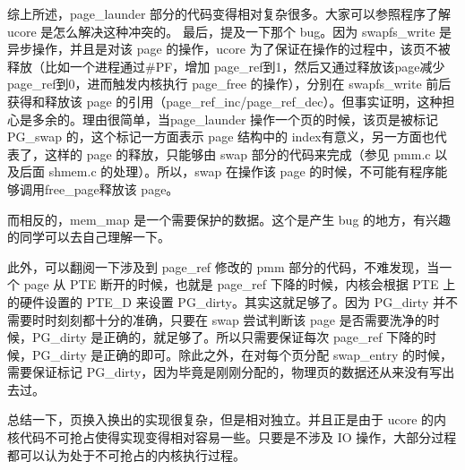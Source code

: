 综上所述，page\_launder
部分的代码变得相对复杂很多。大家可以参照程序了解ucore
是怎么解决这种冲突的。 最后，提及一下那个 bug。因为 swapfs\_write
是异步操作，并且是对该 page 的操作，ucore
为了保证在操作的过程中，该页不被释放（比如一个进程通过\#PF，增加
page\_ref到1，然后又通过释放该page减少page\_ref到0，进而触发内核执行
page\_free 的操作），分别在 swapfs\_write 前后获得和释放该 page
的引用（page\_ref\_inc/page\_ref\_dec）。但事实证明，这种担心是多余的。理由很简单，当page\_launder
操作一个页的时候，该页是被标记 PG\_swap 的，这个标记一方面表示 page
结构中的 index有意义，另一方面也代表了，这样的 page 的释放，只能够由
swap 部分的代码来完成（参见 pmm.c 以及后面 shmem.c 的处理）。所以，swap
在操作该 page 的时候，不可能有程序能够调用free\_page释放该 page。

而相反的，mem\_map 是一个需要保护的数据。这个是产生 bug
的地方，有兴趣的同学可以去自己理解一下。

此外，可以翻阅一下涉及到 page\_ref 修改的 pmm
部分的代码，不难发现，当一个 page 从 PTE 断开的时候，也就是 page\_ref
下降的时候，内核会根据 PTE 上的硬件设置的 PTE\_D 来设置
PG\_dirty。其实这就足够了。因为 PG\_dirty
并不需要时时刻刻都十分的准确，只要在 swap 尝试判断该 page
是否需要洗净的时候，PG\_dirty 是正确的，就足够了。所以只需要保证每次
page\_ref 下降的时候，PG\_dirty 是正确的即可。除此之外，在对每个页分配
swap\_entry 的时候，需要保证标记
PG\_dirty，因为毕竟是刚刚分配的，物理页的数据还从来没有写出去过。

总结一下，页换入换出的实现很复杂，但是相对独立。并且正是由于 ucore
的内核代码不可抢占使得实现变得相对容易一些。只要是不涉及 IO
操作，大部分过程都可以认为处于不可抢占的内核执行过程。
